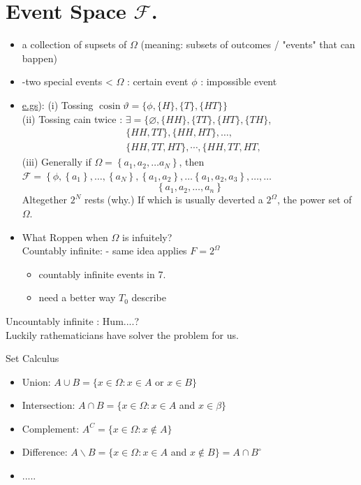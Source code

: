 \documentclass[10pt]{article}
\begin{document}
\section*{Event Space \(\mathcal{F}\).}
\begin{itemize}
  \item[-] a collection of supsets of \(\Omega\) (meaning: subsets of outcomes / "events" that can bappen)
  \item[] -two special events < \(\Omega\) : certain event \(\phi\) : impossible event
  \item[-] \href{http://e.gs}{e.gs}): (i) Tossing \(\operatorname{cosin} \vartheta=\{\phi,\{H\},\{T\},\{H T\}\}\)\\
(ii) Tossing cain twice : \(\exists=\{\varnothing,\{H H\},\{T T\},\{H T\},\{T H\}\),
\[
\begin{aligned}
& \{H H, T T\},\{H H, H T\}, \ldots, \\
& \{H H, T T, H T\}, \cdots,\{H H, T T, H T,
\end{aligned}
\]
(iii) Generally if \(\Omega=\left\{a_{1}, a_{2}, \ldots a_{N}\right\}\), then \(\mathcal{F}=\left\{\phi,\left\{a_{1}\right\}, \ldots,\left\{a_{N}\right\},\left\{a_{1}, a_{2}\right\}, \ldots\left\{a_{1}, a_{2}, a_{3}\right\}, \ldots, \ldots\right.\)
\[
\left\{a_{1}, a_{2}, \ldots, a_{n}\right\}
\]
Altegether \(2^{N}\) rests (why.) If which is usually deverted a \(2^{\Omega}\), the power set of \(\Omega\).
  \item[-] What Roppen when \(\Omega\) is infuitely?\\
Countably infinite: - same idea applies \(F=2^{\Omega}\)
  \begin{itemize}
    \item[-] countably infinite events in 7.
    \item[-] need a better way \(T_{0}\) describe
  \end{itemize}
\end{itemize}

Uncountably infinite : Hum....?\\
Luckily rathematicians have solver the problem for us.

Set Calculus

\begin{itemize}
  \item[(i)] Union: \(A \cup B=\{x \in \Omega: x \in A\) or \(x \in B\}\)
  \item[(ii)] Intersection: \(A \cap B=\{x \in \Omega: x \in A\) and \(x \in \beta\}\)
  \item[(iii)] Complement: \(A^{C}=\{x \in \Omega: x \notin A\}\)
  \item[(iv)] Difference: \(A \backslash B=\{x \in \Omega: x \in A\) and \(x \notin B\}=A \cap B^{\circ}\)
  \item[(v)] .....
\end{itemize}
\end{document}
